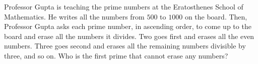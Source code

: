 Professor Gupta is teaching the prime numbers at the Eratosthenes School of Mathematics. He writes all the numbers from $500$ to $1000$ on the board. Then, Professor Gupta asks each prime number, in ascending order, to come up to the board and erase all the numbers it divides. Two goes first and erases all the even numbers. Three goes second and erases all the remaining numbers divisible by three, and so on. Who is the first prime that cannot erase any numbers?
